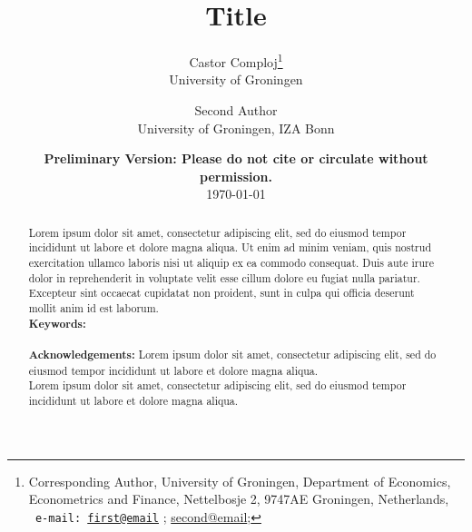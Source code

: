 

\begin{titlepage}
\title{Title} 
\author{Castor Comploj\thanks{Corresponding Author, University of Groningen, Department of Economics, Econometrics and Finance, Nettelbosje 2, 9747AE Groningen, Netherlands, \texttt{\ e-mail:  \href{mailto: first@email}{first@email}} ;
\hspace{0.02in} 
\href{mailto: second@email}{second@email};  \hspace{0.02in}
}
\\ 
\normalsize{University of Groningen}
\and Second Author \\ \normalsize{University of Groningen, IZA Bonn}
}


\date{\textbf{Preliminary Version: Please do not cite or circulate without permission.} \\ \today}
\maketitle

\begin{abstract}
\doublespacing
\thispagestyle{empty}
\noindent Lorem ipsum dolor sit amet, consectetur adipiscing elit, sed do eiusmod tempor incididunt ut labore et dolore magna aliqua. Ut enim ad minim veniam, quis nostrud exercitation ullamco laboris nisi ut aliquip ex ea commodo consequat. Duis aute irure dolor in reprehenderit in voluptate velit esse cillum dolore eu fugiat nulla pariatur. Excepteur sint occaecat cupidatat non proident, sunt in culpa qui officia deserunt mollit anim id est laborum.
\\[0.4cm] 
\textbf{Keywords:} 
\\[0.4cm]
\\[0.4cm]
\singlespacing \footnotesize \noindent  \textbf{Acknowledgements:} 
Lorem ipsum dolor sit amet, consectetur adipiscing elit, sed do eiusmod tempor incididunt ut labore et dolore magna aliqua. 
\\[0.4cm]
Lorem ipsum dolor sit amet, consectetur adipiscing elit, sed do eiusmod tempor incididunt ut labore et dolore magna aliqua. 
\end{abstract}




\end{titlepage}

 